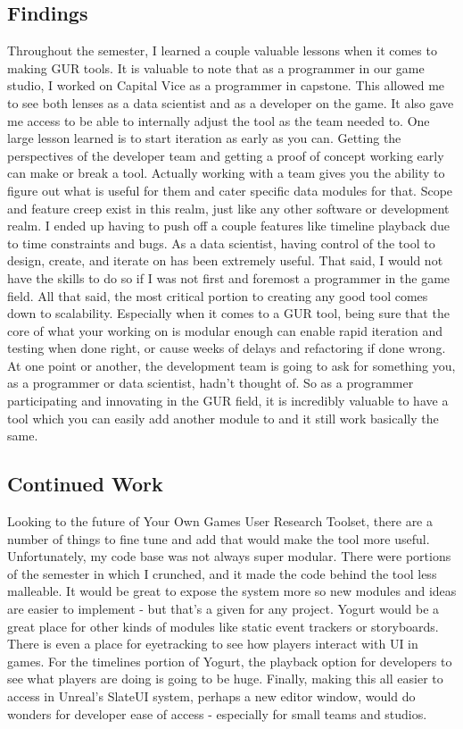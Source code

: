 \documentclass[journal]{IEEEtran}
\begin{document}
\subsection{Findings}

Throughout the semester, I learned a couple valuable lessons when it comes to making GUR tools. It is valuable to note that as a programmer in our game studio, I worked on Capital Vice as a programmer in capstone. This allowed me to see both lenses as a data scientist and as a developer on the game. It also gave me access to be able to internally adjust the tool as the team needed to. One large lesson learned is to start iteration as early as you can. Getting the perspectives of the developer team and getting a proof of concept working early can make or break a tool. Actually working with a team gives you the ability to figure out what is useful for them and cater specific data modules for that. Scope and feature creep exist in this realm, just like any other software or development realm. I ended up having to push off a couple features like timeline playback due to time constraints and bugs. As a data scientist, having control of the tool to design, create, and iterate on has been extremely useful. That said, I would not have the skills to do so if I was not first and foremost a programmer in the game field. All that said, the most critical portion to creating any good tool comes down to scalability. Especially when it comes to a GUR tool, being sure that the core of what your working on is modular enough can enable rapid iteration and testing when done right, or cause weeks of delays and refactoring if done wrong. At one point or another, the development team is going to ask for something you, as a programmer or data scientist, hadn’t thought of. So as a programmer participating and innovating in the GUR field, it is incredibly valuable to have a tool which you can easily add another module to and it still work basically the same.

\subsection{Continued Work}

Looking to the future of Your Own Games User Research Toolset, there are a number of things to fine tune and add that would make the tool more useful. Unfortunately, my code base was not always super modular. There were portions of the semester in which I crunched, and it made the code behind the tool less malleable. It would be great to expose the system more so new modules and ideas are easier to implement - but that’s a given for any project. Yogurt would be a great place for other kinds of modules like static event trackers or storyboards. There is even a place for eyetracking to see how players interact with UI in games. For the timelines portion of Yogurt, the playback option for developers to see what players are doing is going to be huge. Finally, making this all easier to access in Unreal’s SlateUI system, perhaps a new editor window, would do wonders for developer ease of access - especially for small teams and studios.
\end{document}
